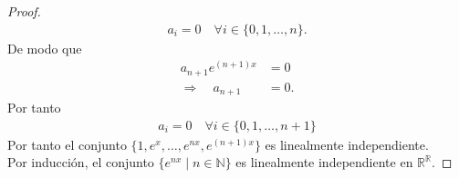 \documentclass[11pt,letterpaper]{article}
\newcommand{\R}{\mathbb{R}}
\newcommand{\N}{\mathbb{N}}
\begin{document}
\begin{proof}
\begin{align*}
        a_i=0 \quad \forall i \in \{0,1,\dots,n\}.
    \end{align*}
    De modo que
    \begin{align*}
        a_{n+1} e^{(n+1)x} &= 0 \\
        \Rightarrow \quad a_{n+1} &= 0.
    \end{align*}
    Por tanto
    \begin{align*}
        a_i=0 \quad \forall i \in \{0,1,\dots,n+1\}
    \end{align*}
    Por tanto el conjunto $\{1, e^x, \dots, e^{nx}, e^{(n+1)x}\}$ es linealmente independiente.\\
    Por inducción, el conjunto $\{e^{nx} \mid n \in \N\}$ es linealmente independiente en $\R^{\R}$.
\end{proof}\,\\
\end{document}
